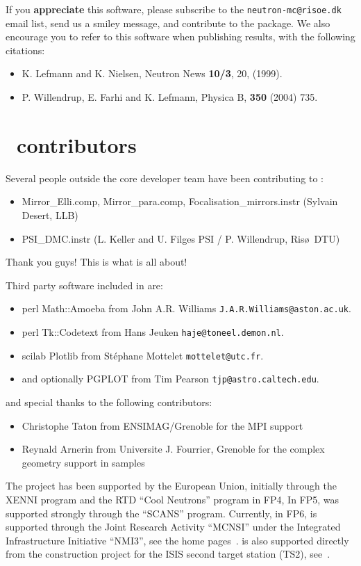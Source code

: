 If you {\bf appreciate} this software, please subscribe to the \verb+neutron-mc@risoe.dk+ email list, send us a smiley message, and contribute to the package. We also encourage you to refer to this software when publishing results, with the following citations:
\begin{itemize}
\item{K. Lefmann and K. Nielsen, Neutron News {\bf 10/3}, 20, (1999).}
\item{P. Willendrup, E. Farhi and K. Lefmann, Physica B, {\bf 350} (2004) 735.}
\end{itemize}


\section*{\MCS \version\ contributors}
Several people outside the core developer team have been contributing
to \MCS \version:
\begin{itemize}
\item Mirror\_Elli.comp, Mirror\_para.comp,
  Focalisation\_mirrors.instr (Sylvain Desert, LLB)
\item PSI\_DMC.instr (L. Keller and U. Filges PSI / P. Willendrup, Ris\o\ DTU)
\end{itemize}
Thank you 	guys! This is what \MCS is all about!

Third party software included in \MCS are:
\begin{itemize}
\item perl Math::Amoeba from John A.R. Williams \verb+J.A.R.Williams@aston.ac.uk+.
\item perl Tk::Codetext from Hans Jeuken \verb+haje@toneel.demon.nl+.
\item scilab Plotlib from St\'ephane Mottelet \verb+mottelet@utc.fr+.
\item and optionally PGPLOT from Tim Pearson \verb+tjp@astro.caltech.edu+.
\end{itemize}
and special thanks to the following \MCS contributors:
\begin{itemize}
\item Christophe Taton from ENSIMAG/Grenoble for the MPI support
\item Reynald Arnerin from Universite J. Fourrier, Grenoble for the complex geometry support in samples
\end{itemize} 

The \MCS project has been supported by the European Union, initially
through the XENNI program and the RTD ``Cool Neutrons'' program in FP4,
In FP5, \MCS was supported strongly through the
``SCANS'' program.
Currently, in FP6, \MCS is supported through the Joint Research Activity
``MCNSI'' under the Integrated Infrastructure Initiative ``NMI3'', see
the home pages~\cite{mcnsi_webpage,nmi3_webpage}. \MCS is also
supported directly from the construction project for the ISIS second
target station (TS2), see~\cite{ts2_webpage}.
